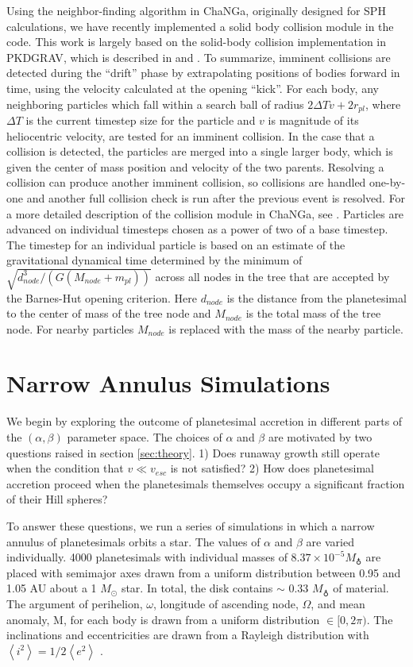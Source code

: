 \documentclass[twocolumn,linenumbers]{aastex63}
\begin{document}
Using the neighbor-finding algorithm in {\sc ChaNGa}, originally
designed for SPH calculations, we have recently implemented a solid
body collision module in the code.  This work is largely based on the
solid-body collision implementation in {\sc PKDGRAV}, which is
described in \citet{richardson94} and \citet{richardson00}. To
summarize, imminent collisions are detected during the ``drift'' phase
by extrapolating positions of bodies forward in time, using the
velocity calculated at the opening ``kick''. For each body, any
neighboring particles which fall within a search ball of radius
$2 \Delta T v + 2 r_{pl}$, where $\Delta T$ is the current timestep size
for the particle and $v$ is magnitude of its heliocentric velocity,
 are tested for an imminent collision. In the case that
a collision is detected, the particles are merged into a single larger
body, which is given the center of mass position and velocity of the
two parents. Resolving a collision can produce another imminent
collision, so collisions are handled one-by-one and another full
collision check is run after the previous event is resolved. For a
more detailed description of the collision module in {\sc ChaNGa}, see
\citep{wallace19}.
Particles are advanced on individual timesteps chosen as a
power of two of a base timestep.  The timestep for an individual
particle is based on an estimate of the gravitational dynamical time
determined by the minimum of $\sqrt{d_{node}^3/(G(M_{node} + m_{pl}))}$
across all nodes in the tree that are accepted by the Barnes-Hut
opening criterion.  Here $d_{node}$ is the distance from the
planetesimal to the center of mass of the tree node and $M_{node}$ is
the total mass of the tree node.  For nearby particles $M_{node}$ is
replaced with the mass of the nearby particle.

\section{Narrow Annulus Simulations}\label{sec:narrow}

We begin by 
exploring the outcome of planetesimal accretion in different parts of the $\left( \alpha, \beta \right)$
parameter space. The choices of $\alpha$ and $\beta$ are motivated by two questions raised in section \ref{sec:theory}. 1) Does
runaway growth still operate when the condition that $v \ll v_{esc}$
is not satisfied? 2) How does planetesimal accretion proceed when the planetesimals themselves occupy a significant fraction of 
their Hill spheres?

To answer these questions, we run a series of simulations in which a
narrow annulus of planetesimals orbits a star. The values of $\alpha$
and $\beta$ are varied individually. 4000 planetesimals with
individual masses of $8.37 \times 10^{-5} M_{\earth}$ are placed with semimajor
axes drawn from a uniform distribution between 0.95 and 1.05 AU about a 1 $M_{\odot}$
star. In total, the disk contains $\sim$ 0.33 $M_{\earth}$ of material. The argument of perihelion, $\omega$, longitude of ascending node,
$\Omega$, and mean anomaly, M, for each body is drawn from a uniform
distribution $\in [0, 2 \pi)$. The inclinations and eccentricities are drawn
from a Rayleigh distribution with
$\left< i^{2} \right> = 1/2 \left< e^{2} \right>$ \citep{ida93a}.
\end{document}
